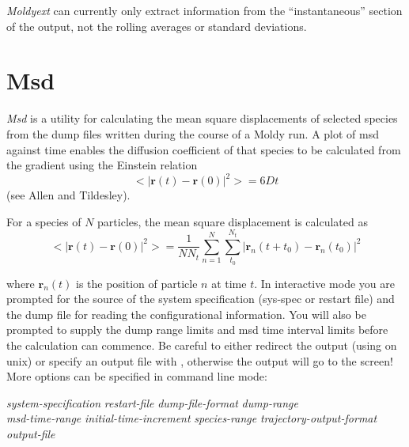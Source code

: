 \documentclass[a4paper,twoside]{report}
\providecommand{\bm}[1]{\mathbf{#1}}
\begin{document}
\emph{Moldyext} can currently only extract information from the
``instantaneous'' section of the output, not the rolling averages or
standard deviations.

\section{Msd}%
\emph{Msd} is a utility for calculating the mean square displacements
of selected species from the dump files written during the course of a
Moldy run. A plot of msd against time enables the diffusion
coefficient of that species to be calculated from the gradient using
the Einstein relation
\begin{equation}
   <|\bm{r}(t)-\bm{r}(0)|^2> = 6 D t
\end{equation}
(see Allen and Tildesley\cite[p60]{allen:87}).

For a species of $N$ particles, the mean square displacement is
calculated as
\begin{equation}  
        <|\bm{r}(t)-\bm{r}(0)|^2> = \frac{1}{N N_t}
        \sum_{n=1}^{N} \sum_{t_0}^{N_t}
        |\bm{r}_n(t+t_0) - \bm{r}_n(t_0)|^2
\end{equation}

where $\bm{r}_n(t)$ is the position of particle $n$ at
time $t$.  In interactive mode you are prompted for the source of the
system specification (sys-spec or restart file) and the dump file for
reading the configurational information. You will also be prompted to
supply the dump range limits and msd time interval limits before the
calculation can commence. Be careful to either redirect the output
(using \Lit{>} on unix) or specify an output file with ,
otherwise the output will go to the screen!  More options can be
specified in command line mode:

\begin{center}
\Lit{[-s} \textit{system-specification} \Lit{|}
 \textit{restart-file}\Lit{]}
\Lit{[-d} \textit{dump-file-format}\Lit{]}
\Lit{[-t} \textit{dump-range}\Lit{]} \\
\Lit{[-c]}
\Lit{[-m} \textit{msd-time-range}\Lit{]}
\Lit{[-i} \textit{initial-time-increment}\Lit{]}
\Lit{[-g} \textit{species-range}\Lit{]}
\Lit{[-w} \textit{trajectory-output-format}\Lit{]} \\
\Lit{[-x|-X]} \Lit{[-y|-Y]} \Lit{[-z|-Z]}
\Lit{[-o} \textit{output-file} \Lit{]}
\end{center}
\end{document}
